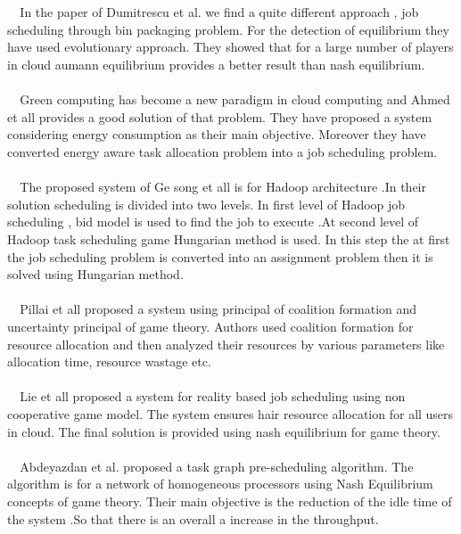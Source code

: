 \documentclass{report}
\begin{document}
\verb|  |In the paper of Dumitrescu et al. we find a quite different  approach , job scheduling through bin packaging problem. For the detection of equilibrium  they have used evolutionary approach. They showed that for a large number of players in cloud aumann equilibrium provides a better result than nash equilibrium.\cite{Dumitrescu}\\\\
\verb|  |Green computing has become a new paradigm in cloud computing and Ahmed et all provides a good solution of that problem. They  have proposed a system considering energy  consumption as their main objective. Moreover they have converted energy aware task allocation problem into a job scheduling problem.\cite{Ahmed}\\\\
\verb|  |The proposed system of Ge song et all is for Hadoop architecture .In their solution scheduling is divided into two levels. In first level of Hadoop job scheduling , bid model is used to find the job  to execute .At second level of Hadoop task scheduling game Hungarian method is used. In this step the at first the job scheduling problem is converted into an assignment problem then it is solved using Hungarian method.\cite{Ge}\\\\
\verb|  |Pillai et all proposed a system using principal of coalition formation and uncertainty principal of  game theory. Authors used coalition formation for resource allocation  and then analyzed their resources by various parameters like allocation time, resource wastage etc.\cite{Pillai}\\\\
\verb|  |Lie et all proposed a system  for reality based job scheduling using non cooperative game model. The system ensures hair resource allocation for all users in cloud. The final solution is provided using nash equilibrium for game theory.\cite{Li}\\\\
\verb|  |Abdeyazdan et al. proposed a task graph pre-scheduling algorithm. The algorithm is  for a network of homogeneous processors using Nash Equilibrium concepts of game theory. Their main objective is  the reduction of the idle time of the system .So that there is an overall a increase in the throughput.\cite{Abdeyazdan}\\\\
\end{document}
